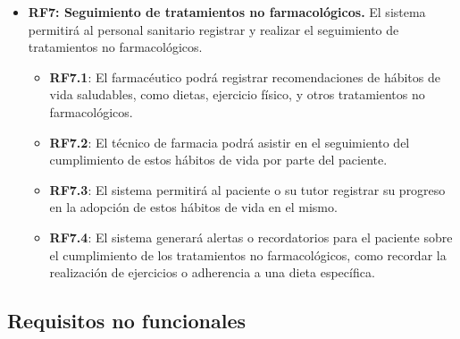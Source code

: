 \begin{itemize}
	\item \textbf{RF7: Seguimiento de tratamientos no farmacológicos.} El sistema permitirá al personal sanitario registrar y realizar el seguimiento de tratamientos no farmacológicos.
	
	\begin{itemize}
		\item \textbf{RF7.1}: El farmacéutico podrá registrar recomendaciones de hábitos de vida saludables, como dietas, ejercicio físico, y otros tratamientos no farmacológicos.
		\item \textbf{RF7.2}: El técnico de farmacia podrá asistir en el seguimiento del cumplimiento de estos hábitos de vida por parte del paciente.
		\item \textbf{RF7.3}: El sistema permitirá al paciente o su tutor registrar su progreso en la adopción de estos hábitos de vida en el mismo.
		\item \textbf{RF7.4}: El sistema generará alertas o recordatorios para el paciente sobre el cumplimiento de los tratamientos no farmacológicos, como recordar la realización de ejercicios o adherencia a una dieta específica.
	\end{itemize}

\end{itemize}

\subsection{Requisitos no funcionales}

